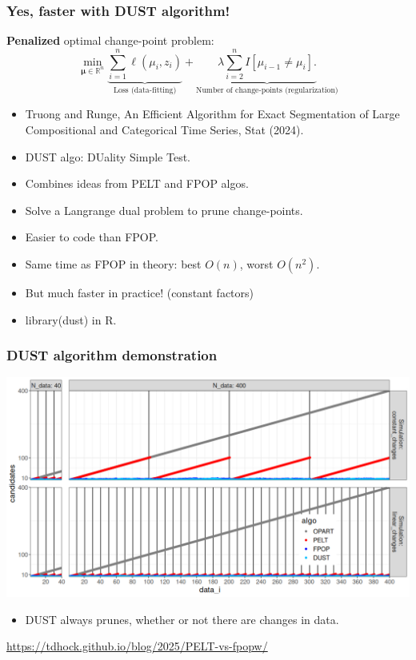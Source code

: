\documentclass{beamer}
\newcommand{\RR}{\mathbb R}
\begin{document}
\begin{frame}
  \frametitle{Yes, faster with DUST algorithm!}
  \textbf{Penalized} optimal change-point problem:
$$
\min_{
  \mathbf \mu\in\RR^{n}
}
\underbrace{\sum_{i=1}^{n} \ell( \mu_i,  z_i)}_{\text{Loss (data-fitting)}} + \underbrace{\lambda\sum_{i=2}^n I[\mu_{i-1}\neq \mu_i].}_{\text{Number of change-points (regularization)}}
$$
\begin{itemize}
\item Truong and Runge, An Efficient Algorithm for Exact
  Segmentation of Large Compositional and Categorical Time Series,
  Stat (2024).
\item DUST algo: DUality Simple Test.
\item Combines ideas from PELT and FPOP algos.
\item Solve a Langrange dual problem to prune change-points.
\item Easier to code than FPOP.
\item Same time as FPOP in theory: best $O(n)$, worst $O(n^2)$.
\item But much faster in practice! (constant factors)
\item library(dust) in R.
\end{itemize}
\end{frame}

\begin{frame}
  \frametitle{DUST algorithm demonstration}
  \includegraphics[width=\textwidth]{dust-prune-1.png}

  \begin{itemize}
  \item DUST always prunes, whether or not there are changes in data.
  \end{itemize}

  \url{https://tdhock.github.io/blog/2025/PELT-vs-fpopw/}
\end{frame}
\end{document}
